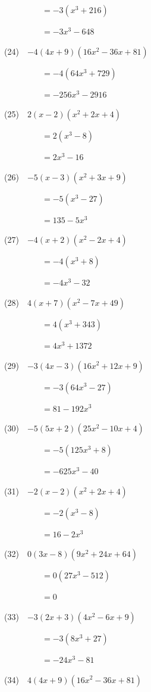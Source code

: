 \documentclass[a4j,twocolumn,10pt,fleqn]{jarticle}
\begin{document}
~~~~~~~~~$=-3(x^{3} + 216)$

~~~~~~~~~$=- 3 x^{3} - 648$

(24)~~$-4\left(4 x + 9\right) \left(16 x^{2} - 36 x + 81\right)$

~~~~~~~~~$=-4(64 x^{3} + 729)$

~~~~~~~~~$=- 256 x^{3} - 2916$

(25)~~$2\left(x - 2\right) \left(x^{2} + 2 x + 4\right)$

~~~~~~~~~$=2(x^{3} - 8)$

~~~~~~~~~$=2 x^{3} - 16$

(26)~~$-5\left(x - 3\right) \left(x^{2} + 3 x + 9\right)$

~~~~~~~~~$=-5(x^{3} - 27)$

~~~~~~~~~$=135 - 5 x^{3}$

(27)~~$-4\left(x + 2\right) \left(x^{2} - 2 x + 4\right)$

~~~~~~~~~$=-4(x^{3} + 8)$

~~~~~~~~~$=- 4 x^{3} - 32$

(28)~~$4\left(x + 7\right) \left(x^{2} - 7 x + 49\right)$

~~~~~~~~~$=4(x^{3} + 343)$

~~~~~~~~~$=4 x^{3} + 1372$

(29)~~$-3\left(4 x - 3\right) \left(16 x^{2} + 12 x + 9\right)$

~~~~~~~~~$=-3(64 x^{3} - 27)$

~~~~~~~~~$=81 - 192 x^{3}$

(30)~~$-5\left(5 x + 2\right) \left(25 x^{2} - 10 x + 4\right)$

~~~~~~~~~$=-5(125 x^{3} + 8)$

~~~~~~~~~$=- 625 x^{3} - 40$

(31)~~$-2\left(x - 2\right) \left(x^{2} + 2 x + 4\right)$

~~~~~~~~~$=-2(x^{3} - 8)$

~~~~~~~~~$=16 - 2 x^{3}$

(32)~~$0\left(3 x - 8\right) \left(9 x^{2} + 24 x + 64\right)$

~~~~~~~~~$=0(27 x^{3} - 512)$

~~~~~~~~~$=0$

(33)~~$-3\left(2 x + 3\right) \left(4 x^{2} - 6 x + 9\right)$

~~~~~~~~~$=-3(8 x^{3} + 27)$

~~~~~~~~~$=- 24 x^{3} - 81$

(34)~~$4\left(4 x + 9\right) \left(16 x^{2} - 36 x + 81\right)$
\end{document}
